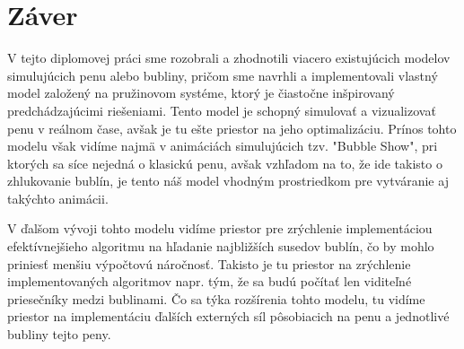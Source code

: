 \chapter{Záver}\label{chap:conclusion}

V tejto diplomovej práci sme rozobrali a zhodnotili viacero existujúcich modelov simulujúcich penu alebo bubliny, pričom sme navrhli a implementovali vlastný model založený na pružinovom systéme, ktorý je čiastočne inšpirovaný predchádzajúcimi riešeniami. Tento model je schopný simulovať a vizualizovať penu v reálnom čase, avšak je tu ešte priestor na jeho optimalizáciu. Prínos tohto modelu však vidíme najmä v animáciách simulujúcich tzv. "Bubble Show", pri ktorých sa síce nejedná o klasickú penu, avšak vzhľadom na to, že ide takisto o zhlukovanie bublín, je tento náš model vhodným prostriedkom pre vytváranie aj takýchto animácii.

V ďalšom vývoji tohto modelu vidíme priestor pre zrýchlenie implementáciou efektívnejšieho algoritmu na hľadanie najbližších susedov bublín, čo by mohlo priniesť menšiu výpočtovú náročnosť. Takisto je tu priestor na zrýchlenie implementovaných algoritmov napr. tým, že sa budú počítať len viditeľné priesečníky medzi bublinami. Čo sa týka rozšírenia tohto modelu, tu vidíme priestor na implementáciu ďalších externých síl pôsobiacich na penu a jednotlivé bubliny tejto peny.